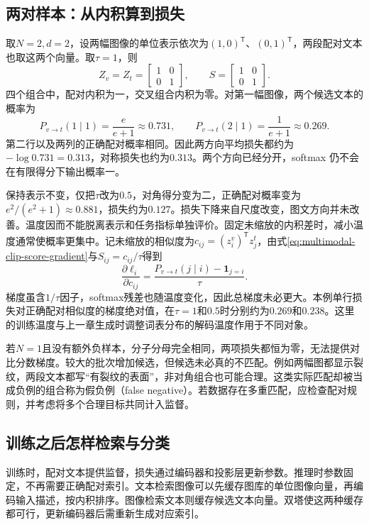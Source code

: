 \subsection{两对样本：从内积算到损失}
取$N=2,d=2$，设两幅图像的单位表示依次为$(1,0)^{\mathsf T}$、$(0,1)^{\mathsf T}$，两段配对文本也取这两个向量。取$\tau=1$，则
\begin{equation}
 Z_v=Z_t=\begin{bmatrix}1&0\\0&1\end{bmatrix},\qquad
 S=\begin{bmatrix}1&0\\0&1\end{bmatrix}.
\end{equation}
四个组合中，配对内积为一，交叉组合内积为零。对第一幅图像，两个候选文本的概率为
\begin{equation}
 P_{v\to t}(1\mid1)=\frac{e}{e+1}\approx0.731,\qquad
 P_{v\to t}(2\mid1)=\frac1{e+1}\approx0.269.
\end{equation}
第二行以及两列的正确配对概率相同。因此两方向平均损失都约为$-\log0.731=0.313$，对称损失也约为$0.313$。两个方向已经分开，softmax 仍不会在有限得分下输出概率一。

保持表示不变，仅把$\tau$改为$0.5$，对角得分变为二，正确配对概率变为$e^2/(e^2+1)\approx0.881$，损失约为$0.127$。损失下降来自尺度改变，图文方向并未改善。温度因而不能脱离表示和任务指标单独评价。固定未缩放的内积差时，减小温度通常使概率更集中。记未缩放的相似度为$c_{ij}=(z_i^v)^{\mathsf T}z_j^t$，由式\eqref{eq:multimodal-clip-score-gradient}与$S_{ij}=c_{ij}/\tau$得到
\[
 \frac{\partial\ell_i}{\partial c_{ij}}
 =\frac{P_{v\to t}(j\mid i)-\mathbf1_{j=i}}{\tau}.
\]
梯度虽含$1/\tau$因子，softmax残差也随温度变化，因此总梯度未必更大。本例单行损失对正确配对相似度的梯度绝对值，在$\tau=1$和$0.5$时分别约为$0.269$和$0.238$。这里的训练温度与上一章生成时调整词表分布的解码温度作用于不同对象。

若$N=1$且没有额外负样本，分子分母完全相同，两项损失都恒为零，无法提供对比分数梯度。较大的批次增加候选，但候选未必真的不匹配。例如两幅图都显示裂纹，两段文本都写“有裂纹的表面”，非对角组合也可能合理。这类实际匹配却被当成负例的组合称为假负例（false negative）。若数据存在多重匹配，应检查配对规则，并考虑将多个合理目标共同计入监督。

\subsection{训练之后怎样检索与分类}
训练时，配对文本提供监督，损失通过编码器和投影层更新参数。推理时参数固定，不再需要正确配对索引。文本检索图像可以先缓存图库的单位图像向量，再编码输入描述，按内积排序。图像检索文本则缓存候选文本向量。双塔使这两种缓存都可行，更新编码器后需重新生成对应索引。


